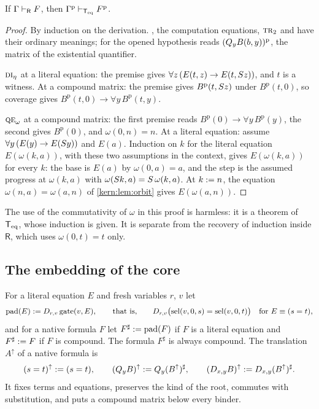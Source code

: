 \begin{theorem}[Soundness]
\label{kern:thm:rsound}
If $\Gamma\vdash_{\mathsf{R}}F$, then
$\Gamma^{\mathrm{p}}\vdash_{\mathsf{T}_{\mathrm{eq}}}F^{\mathrm{p}}$.
\end{theorem}

\begin{proof}
By induction on the derivation.  , the computation equations,
$\rulename{Tr}_{2}$ and  have their ordinary meanings; for
 the opened hypothesis reads $(Q_{y}B(b,y))^{\mathrm{p}}$, the
matrix of the existential quantifier.

$\rulename{DI}_{\eta}$ at a literal equation: the premise gives
$\forall z\,(E(t,z)\to E(t,S z))$, and $t$ is a witness.  At a compound
matrix: the premise gives $B^{\mathrm{p}}(t,S z)$ under
$B^{\mathrm{p}}(t,0)$, so coverage gives
$B^{\mathrm{p}}(t,0)\to\forall y\,B^{\mathrm{p}}(t,y)$.

$\rulename{QE}_{\omega}$ at a compound matrix: the first premise reads
$B^{\mathrm{p}}(0)\to\forall y\,B^{\mathrm{p}}(y)$, the second gives
$B^{\mathrm{p}}(0)$, and $\omega(0,n)=n$.  At a literal equation: assume
$\forall y\,(E(y)\to E(S y))$ and $E(a)$.  Induction on $k$ for the
literal equation $E(\omega(k,a))$, with these two assumptions in the
context, gives $E(\omega(k,a))$ for every $k$: the base is $E(a)$ by
$\omega(0,a)=a$, and the step is the assumed progress at $\omega(k,a)$ with
$\omega(S k,a)=S\,\omega(k,a)$.  At $k\mathrel{:=} n$, the equation
$\omega(n,a)=\omega(a,n)$ of \cref{kern:lem:orbit} gives $E(\omega(a,n))$.
\end{proof}

The use of the commutativity of $\omega$ in this proof is harmless: it is a
theorem of $\mathsf{T}_{\mathrm{eq}}$, whose induction is given.  It is separate from the
recovery of induction inside $\mathsf{R}$, which uses $\omega(0,t)=t$ only.

\subsection{The embedding of the core}
\label{kern:sec:Rup}

For a literal equation $E$ and fresh variables $r$, $v$ let
\[
 \operatorname{pad}(E)\mathrel{:=}D_{r,v}\operatorname{gate}(v,E),
 \qquad\text{that is,}\qquad
 D_{r,v}\bigl(\operatorname{sel}(v,0,s)=\operatorname{sel}(v,0,t)\bigr)\quad\text{for }E\equiv(s=t),
\]
and for a native formula $F$ let $F^{\sharp}\mathrel{:=}\operatorname{pad}(F)$ if
$F$ is a literal equation and $F^{\sharp}\mathrel{:=} F$ if $F$ is compound.  The
formula $F^{\sharp}$ is always compound.  The translation $A^{\uparrow}$ of a
native formula is
\[
 (s=t)^{\uparrow}\mathrel{:=}(s=t),\qquad
 (Q_{y}B)^{\uparrow}\mathrel{:=}Q_{y}(B^{\uparrow})^{\sharp},\qquad
 (D_{x,y}B)^{\uparrow}\mathrel{:=}D_{x,y}(B^{\uparrow})^{\sharp}.
\]
It fixes terms and equations, preserves the kind of the root, commutes with
substitution, and puts a compound matrix below every binder.

